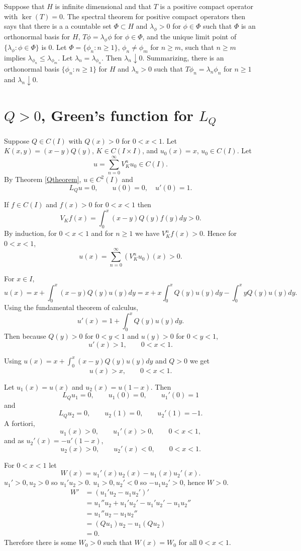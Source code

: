 \documentclass{article}
\theoremstyle{definition}
\begin{document}
Suppose that $H$ is infinite dimensional and that
$T$ is a positive compact operator with $\ker(T) = 0$. 
The spectral theorem for positive compact operators then says that there is a
a countable set $\Phi \subset H$ and $\lambda_\phi>0$ for $\phi \in \Phi$ such that
$\Phi$ is an orthonormal basis for $H$, $T\phi = \lambda_\phi \phi$ for $\phi \in \Phi$,
and the unique limit point of $\{\lambda_\phi:\phi \in \Phi\}$ is $0$.
Let $\Phi = \{\phi_n: n \geq 1\}$, $\phi_n \neq \phi_m$ for $n \geq m$,
 such that $n \geq m$ implies $\lambda_{\phi_n} \leq \lambda_{\phi_m}$. 
Let $\lambda_n=\lambda_{\phi_n}$. Then $\lambda_n \downarrow 0$. 
Summarizing, there is an orthonormal basis $\{\phi_n: n \geq 1\}$ for $H$ and $\lambda_n>0$ such that
$T\phi_n=\lambda_n \phi_n$ for $n \geq 1$ and $\lambda_n \downarrow 0$. 



\section{$Q>0$, Green's function for $L_Q$}
Suppose $Q \in C(I)$ with $Q(x) > 0$ for $0<x<1$. 
Let $K(x,y)=(x-y)Q(y)$, $K \in C(I \times I)$, and $u_0(x)=x$, $u_0 \in C(I)$.
Let
\[
u=\sum_{n=0}^\infty V_K^n u_0 \in C(I).
\]
By Theorem \ref{Qtheorem}, $u \in C^2(I)$ and
\[
L_Qu=0,\qquad u(0)=0, \quad u'(0)=1.
\]

If $f \in C(I)$ and $f(x)>0$ for $0<x<1$ then 
\[
V_Kf(x) = \int_0^x (x-y)Q(y) f(y) dy
>0.
\]
By induction, for $0<x<1$ and for $n \geq 1$ we have $V_K^n f(x)>0$.
Hence
for $0<x<1$,
\[
u(x)=\sum_{n=0}^\infty (V_K^n u_0)(x)
> 0.
\]

For $x \in I$,
\[
u(x)=x+\int_0^x (x-y)Q(y) u(y)dy=x+x\int_0^x Q(y) u(y)dy
-\int_0^x yQ(y)u(y) dy.
\]
Using the fundamental theorem of calculus,
\[
u'(x)=1+\int_0^x Q(y)u(y) dy.
\]
Then because $Q(y)>0$ for $0<y<1$ and $u(y)>0$ for $0 < y < 1$,
\[
u'(x)>1,\qquad 0<x<1.
\]

Using $u(x)=x+\int_0^x (x-y)Q(y) u(y)dy$ and $Q>0$ we get
\[
u(x)>x,\qquad 0<x< 1.
\]

Let $u_1(x)=u(x)$ and $u_2(x)=u(1-x)$.
Then 
\[
L_Qu_1=0,\qquad u_1(0)=0,\qquad u_1'(0)=1
\]
and
\[
L_Qu_2=0,\qquad u_2(1)=0,\qquad u_2'(1)=-1.
\]
A fortiori,
\[
u_1(x)>0,\qquad u_1'(x)>0,\qquad 0<x<1,
\]
and as $u_2'(x)=-u'(1-x)$,
\[
u_2(x)>0,\qquad u_2'(x)<0,\qquad 0<x<1.
\]

For $0<x<1$ let
\[
W(x)=u_1'(x)u_2(x)-u_1(x)u_2'(x).
\]
$u_1'>0, u_2>0$ so $u_1'u_2>0$.
$u_1>0, u_2'<0$ so $-u_1u_2'>0$, hence $W>0$.
\begin{align*}
W'&=(u_1'u_2-u_1u_2')'\\
&=u_1''u_2+u_1'u_2'-u_1'u_2'-u_1u_2''\\
&=u_1''u_2-u_1u_2''\\
&=(Qu_1)u_2-u_1(Qu_2)\\
&=0.
\end{align*}
Therefore there is some $W_0>0$ such that $W(x)=W_0$ for all $0<x<1$. 
\end{document}
